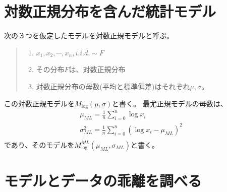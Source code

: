 


\section{対数正規分布を含んだ統計モデル}
次の３つを仮定したモデルを対数正規モデルと呼ぶ。
\begin{quote}
    \begin{enumerate}[(1)]
    \item $x_1,x_2,\cdots,x_n, i.i.d. \sim F$
    \item その分布$F$は、対数正規分布
    \item 対数正規分布の母数(平均と標準偏差)はそれぞれ$\mu,\sigma$。
    \end{enumerate}
\end{quote}

この対数正規モデルを$M_{\log}(\mu,\sigma)$と書く。
最尤正規モデルの母数は、
\begin{eqnarray*}
 \mu_{ML} = \frac{1}{n}\sum_{i=0}^{n} \log x_i \\
 \sigma^2_{ML}= \frac{1}{n}\sum_{i=0}^{n} (\log x_i  -\mu_{ML})^2 \\
\end{eqnarray*}
であり、そのモデルを$M^{ML}_{\log}(\mu_{ML},\sigma_{ML})$と書く。



\section{モデルとデータの乖離を調べる}

